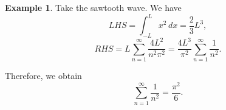 \documentclass[12pt]{article}
\theoremstyle{definition}
\newtheorem{example}{Example}[section]
\theoremstyle{remark}
\begin{document}
\begin{adjustbox}{minipage = \columnwidth - 25.5pt, margin=1em, frame=1pt, margin=0em}
\begin{example}
	Take the sawtooth wave. We have
	\[
	LHS = \int_{-L}^{L} x^2 \, dx = \frac{2}{3}L^3
	,\]
	\[
	RHS = L \sum_{n = 1}^{\infty} \frac{4L^2}{n^2 \pi^2} = \frac{4L^3}{\pi ^2}\sum_{n = 1}^{\infty} \frac{1}{n^2}
	.\]

\end{example}

\end{adjustbox}

\begin{adjustbox}{minipage = \columnwidth - 25.5pt, margin=1em, frame=1pt, margin=0em}
Therefore, we obtain
\[
\sum_{n = 1}^{\infty} \frac{1}{n^2} = \frac{\pi^2}{6}
.\]
\end{adjustbox}


\newpage

\printindex
\end{document}
